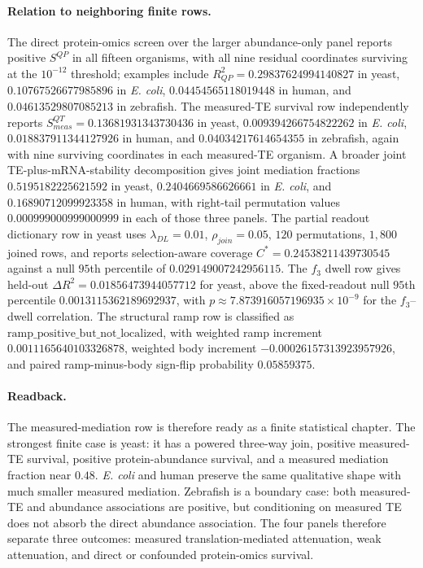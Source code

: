 \paragraph{Relation to neighboring finite rows.}
The direct protein-omics screen over the larger abundance-only panel reports positive $S^{QP}$ in all fifteen organisms, with all nine residual coordinates surviving at the $10^{-12}$ threshold; examples include $R^2_{QP}=0.29837624994140827$ in yeast, $0.10767526677985896$ in \emph{E. coli}, $0.04454565118019448$ in human, and $0.04613529807085213$ in zebrafish. The measured-TE survival row independently reports $S^{QT}_{meas}=0.13681931343730436$ in yeast, $0.009394266754822262$ in \emph{E. coli}, $0.018837911344127926$ in human, and $0.04034217614654355$ in zebrafish, again with nine surviving coordinates in each measured-TE organism. A broader joint TE-plus-mRNA-stability decomposition gives joint mediation fractions $0.5195182225621592$ in yeast, $0.2404669586626661$ in \emph{E. coli}, and $0.16890712099923358$ in human, with right-tail permutation values $0.000999000999000999$ in each of those three panels. The partial readout dictionary row in yeast uses $\lambda_{DL}=0.01$, $\rho_{join}=0.05$, $120$ permutations, $1{,}800$ joined rows, and reports selection-aware coverage $C^*=0.24538211439730545$ against a null $95$th percentile of $0.029149007242956115$. The $f_3$ dwell row gives held-out $\Delta R^2=0.01856473944057712$ for yeast, above the fixed-readout null $95$th percentile $0.0013115362189692937$, with $p\approx 7.873916057196935\times 10^{-9}$ for the $f_3$--dwell correlation. The structural ramp row is classified as $\mathrm{ramp\_positive\_but\_not\_localized}$, with weighted ramp increment $0.0011165640103326878$, weighted body increment $-0.00026157313923957926$, and paired ramp-minus-body sign-flip probability $0.05859375$.

\paragraph{Readback.}
The measured-mediation row is therefore ready as a finite statistical chapter. The strongest finite case is yeast: it has a powered three-way join, positive measured-TE survival, positive protein-abundance survival, and a measured mediation fraction near $0.48$. \emph{E. coli} and human preserve the same qualitative shape with much smaller measured mediation. Zebrafish is a boundary case: both measured-TE and abundance associations are positive, but conditioning on measured TE does not absorb the direct abundance association. The four panels therefore separate three outcomes: measured translation-mediated attenuation, weak attenuation, and direct or confounded protein-omics survival.

